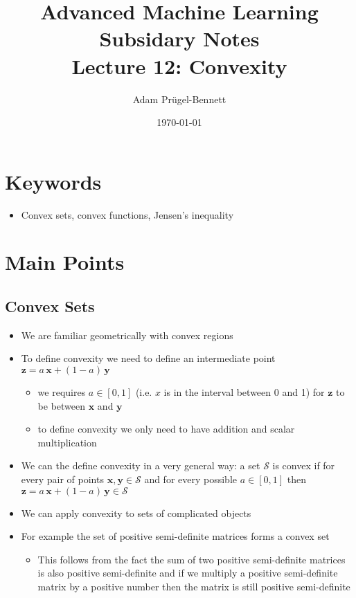 \documentclass[11pt]{article}
\author{Adam Prügel-Bennett}
\date{\today}
\title{Advanced Machine Learning Subsidary Notes\\\medskip
\large Lecture 12: Convexity}
\begin{document}
\maketitle


\section{Keywords}
\label{sec:org2242e1b}
\begin{itemize}
\item Convex sets, convex functions, Jensen's inequality
\end{itemize}

\section{Main Points}
\label{sec:org01fde79}

\subsection{Convex Sets}
\label{sec:org451130e}
\begin{itemize}
\item We are familiar geometrically with convex regions
\item To define convexity we need to define an intermediate point
\(\bm{z} = a\,\bm{x} + (1-a)\,\bm{y}\)
\begin{itemize}
\item we requires \(a\in[0,1]\) (i.e. \(x\) is in the interval between 0 and 1)  for \(\bm{z}\) to be between \(\bm{x}\) and \(\bm{y}\)
\item to define convexity we only need to have addition and scalar multiplication
\end{itemize}
\item We can the define convexity in a very general way: a set
\(\mathcal{S}\) is convex if for every pair of points
\(\bm{x},\bm{y}\in \mathcal{S}\) and for every possible \(a\in[0,1]\) then
\(\bm{z} = a\,\bm{x} + (1-a)\,\bm{y} \in \mathcal{S}\)
\item We can apply convexity to sets of complicated objects
\item For example the set of positive semi-definite matrices forms a convex set
\begin{itemize}
\item This follows from the fact the sum of two positive
semi-definite matrices is also positive semi-definite and if we
multiply a positive semi-definite matrix by a positive number
then the matrix is still positive semi-definite
\end{itemize}
\end{itemize}
\end{document}
